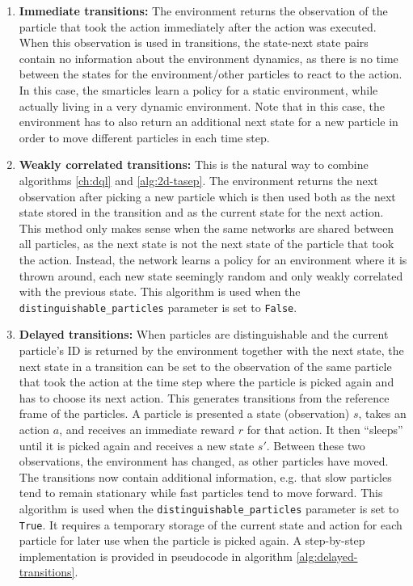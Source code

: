 \begin{enumerate}
    \item \textbf{Immediate transitions:} The environment returns the observation of the particle that took the action immediately after the action was executed. When this observation is used in transitions, the state-next state pairs contain no information about the environment dynamics, as there is no time between the states for the environment/other particles to react to the action. In this case, the smarticles learn a policy for a static environment, while actually living in a very dynamic environment. Note that in this case, the environment has to also return an additional next state for a new particle in order to move different particles in each time step.
    \item \textbf{Weakly correlated transitions:} This is the natural way to combine algorithms \ref{ch:dql} and \ref{alg:2d-tasep}. The environment returns the next observation after picking a new particle which is then used both as the next state stored in the transition and as the current state for the next action. This method only makes sense when the same networks are shared between all particles, as the next state is not the next state of the particle that took the action. Instead, the network learns a policy for an environment where it is thrown around, each new state seemingly random and only weakly correlated with the previous state. This algorithm is used when the \texttt{distinguishable\_particles} parameter is set to \texttt{False}.
    \item \textbf{Delayed transitions:} When particles are distinguishable and the current particle's ID is returned by the environment together with the next state, the next state in a transition can be set to the observation of the same particle that took the action at the time step where the particle is picked again and has to choose its next action. This generates transitions from the reference frame of the particles. A particle is presented a state (observation) $s$, takes an action $a$, and receives an immediate reward $r$ for that action. It then \enquote{sleeps} until it is picked again and receives a new state $s'$. Between these two observations, the environment has changed, as other particles have moved. The transitions now contain additional information, e.g. that slow particles tend to remain stationary while fast particles tend to move forward. This algorithm is used when the \texttt{distinguishable\_particles} parameter is set to \texttt{True}. It requires a temporary storage of the current state and action for each particle for later use when the particle is picked again. A step-by-step implementation is provided in pseudocode in algorithm \ref{alg:delayed-transitions}.
\end{enumerate}

